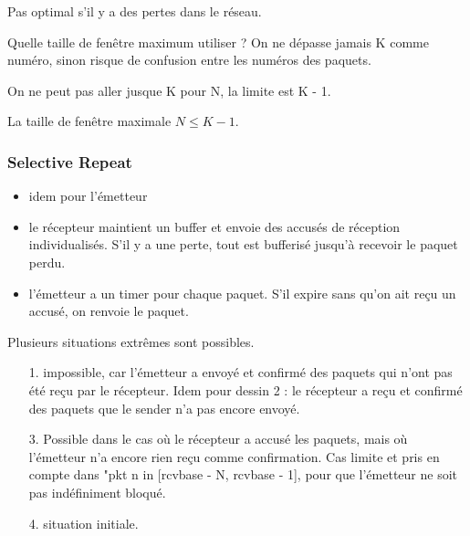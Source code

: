 			Pas optimal s'il y a des pertes dans le réseau.
			
			
			Quelle taille de fenêtre maximum utiliser ? On ne dépasse jamais K comme numéro, sinon risque de confusion entre les numéros des paquets.
			
			On ne peut pas aller jusque K pour N, la limite est K - 1.
			
			

			
			
			La taille de fenêtre maximale $N \leq K - 1$.
			
			
			\subsubsection{Selective Repeat}
			
			\begin{itemize}
				\item idem pour l'émetteur
				\item le récepteur maintient un buffer et envoie des accusés de réception individualisés. S'il y a une perte, tout est bufferisé jusqu'à recevoir le paquet perdu.
				\item l'émetteur a un timer pour chaque paquet. S'il expire sans qu'on ait reçu un accusé, on renvoie le paquet.
			\end{itemize}
		
			
			Plusieurs situations extrêmes sont possibles.				
			
			
			\begin{itemize}
				\item[1.] impossible, car l'émetteur a envoyé et confirmé des paquets qui n'ont pas été reçu par le récepteur. Idem pour dessin 2 : le récepteur a reçu et confirmé des paquets que le sender n'a pas encore envoyé.
			
				\item[3.] Possible dans le cas où le récepteur a accusé les paquets, mais où l'émetteur n'a encore rien reçu comme confirmation. Cas limite et pris en compte dans "pkt n in [rcvbase - N, rcvbase - 1], pour que l'émetteur ne soit pas indéfiniment bloqué.
			
				\item[4.] situation initiale.
			\end{itemize}
			
